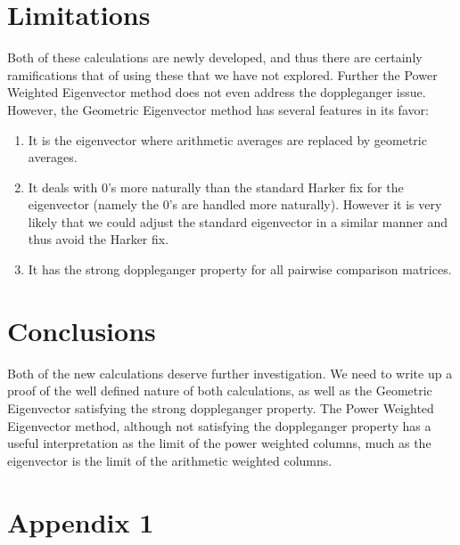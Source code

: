\documentclass[11pt]{article}
\begin{document}
\section{Limitations}
Both of these calculations are newly developed, and thus there are certainly
ramifications that of using these that we have not explored.  Further
the Power Weighted Eigenvector method does not even address the doppleganger issue.
However, the Geometric Eigenvector method has several features in its favor:
\begin{enumerate}
	\item It is the eigenvector where arithmetic averages are replaced by geometric averages.
	\item It deals with 0's more naturally than the standard Harker fix for the eigenvector (namely the 0's are handled more naturally).  However it is very likely that we could adjust the standard eigenvector in a similar manner and thus avoid the Harker fix.
	\item It has the strong doppleganger property for all pairwise comparison matrices.
\end{enumerate}

\section{Conclusions}
Both of the new calculations deserve further investigation.  We need to write up a
proof of the well defined nature of both calculations, as well as the Geometric
Eigenvector satisfying the strong doppleganger property.  The Power Weighted 
Eigenvector method, although not satisfying the doppleganger property has a useful
interpretation as the limit of the power weighted columns, much as the eigenvector
is the limit of the arithmetic weighted columns.





 \section{Appendix 1}
 
\end{document}
